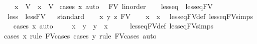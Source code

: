 \begin{isabellebody}
\ \ {\isacharbar}{\kern0pt}\ {\isachardoublequoteopen}x\ {\isacharequal}{\kern0pt}\ V{}{\isachardoublequoteclose}\ {\isacharbar}{\kern0pt}\ {\isachardoublequoteopen}x\ {\isacharequal}{\kern0pt}\ V{}{}{\isachardoublequoteclose}\ \isanewline
%
\isadelimproof
%
\endisadelimproof
%
\isatagproof
{}\isamarkupfalse%
{\isacharparenleft}{\kern0pt}cases\ x{\isacharcomma}{\kern0pt}\ auto{\isacharparenright}{\kern0pt}\ \isamarkupfalse%
%
\endisatagproof
{\isafoldproof}%
%
\isadelimproof
\isanewline
%
\endisadelimproof
\isanewline
{}\isamarkupfalse%
\ FV\ {\isacharcolon}{\kern0pt}{\isacharcolon}{\kern0pt}linorder\ \isanewline
{}\ \isanewline
{}\isamarkupfalse%
\ {\isachardoublequoteopen}less{\isacharunderscore}{\kern0pt}eq\ {\isasymequiv}\ less{\isacharunderscore}{\kern0pt}eq{\isacharunderscore}{\kern0pt}FV{\isachardoublequoteclose}\ \isanewline
{}\isamarkupfalse%
\ {\isachardoublequoteopen}less\ {\isasymequiv}\ less{\isacharunderscore}{\kern0pt}FV{\isachardoublequoteclose}\ \isanewline
\isanewline
{}\isamarkupfalse%
\ \isanewline
%
\isadelimproof
%
\endisadelimproof
%
\isatagproof
{}\isamarkupfalse%
{\isacharparenleft}{\kern0pt}standard{\isacharparenright}{\kern0pt}\isanewline
\ \ \isamarkupfalse%
\ x\ y\ z\ {\isacharcolon}{\kern0pt}{\isacharcolon}{\kern0pt}FV\isanewline
\ \ \isamarkupfalse%
\ {\isachardoublequoteopen}x\ {\isasymle}\ x{\isachardoublequoteclose}\ \isamarkupfalse%
\ less{\isacharunderscore}{\kern0pt}eq{\isacharunderscore}{\kern0pt}FV{\isacharunderscore}{\kern0pt}def\ less{\isacharunderscore}{\kern0pt}eq{\isacharunderscore}{\kern0pt}FV{\isachardot}{\kern0pt}simps\ \isanewline
\ \ \isamarkupfalse%
{\isacharparenleft}{\kern0pt}cases\ x{\isacharcomma}{\kern0pt}\ auto{\isacharparenright}{\kern0pt}\ \isamarkupfalse%
\isanewline
\ \ \isamarkupfalse%
\ {\isachardoublequoteopen}x\ {\isasymle}\ y\ {\isasymor}\ y\ {\isasymle}\ x{\isachardoublequoteclose}\isanewline
\ \ \ \ \isamarkupfalse%
\ less{\isacharunderscore}{\kern0pt}eq{\isacharunderscore}{\kern0pt}FV{\isacharunderscore}{\kern0pt}def\ less{\isacharunderscore}{\kern0pt}eq{\isacharunderscore}{\kern0pt}FV{\isachardot}{\kern0pt}simps\ \isanewline
\ \ \ \ \isamarkupfalse%
{\isacharparenleft}{\kern0pt}cases\ x\ rule{\isacharcolon}{\kern0pt}\ FV{\isacharunderscore}{\kern0pt}cases{\isacharparenright}{\kern0pt}\ {\isacharparenleft}{\kern0pt}cases\ y\ rule{\isacharcolon}{\kern0pt}\ FV{\isacharunderscore}{\kern0pt}cases{\isacharcomma}{\kern0pt}\ auto{\isacharparenright}{\kern0pt}{\isacharplus}{\kern0pt}\isanewline

\end{isabellebody}
